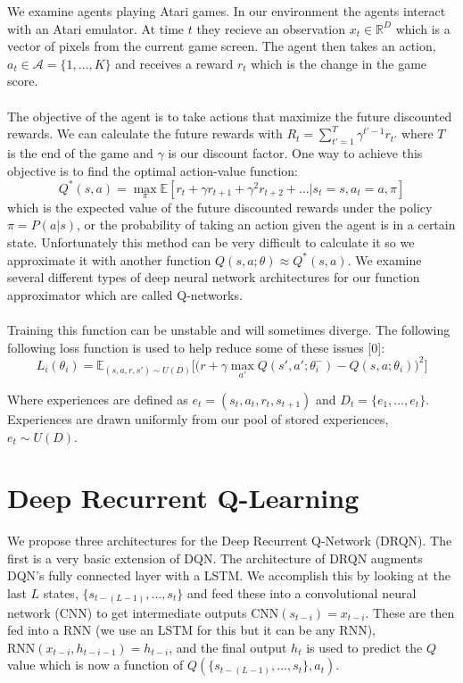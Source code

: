 \documentclass{article}
\begin{document}
We examine agents playing Atari games. In our environment the agents interact with
an Atari emulator. At time $t$ they recieve an observation $x_t \in \mathbb{R}^D$
which is a vector of pixels from the current game screen. The agent then takes an
action, $a_t \in \mathcal{A} = \{1, \dots, K\}$ and receives a reward $r_t$ which
is the change in the game score. \\
\\
The objective of the agent is to take actions that maximize the future discounted
rewards. We can calculate the future rewards with $R_t = \sum_{t' = 1}^T \gamma^{t'-1}r_{t'}$
where $T$ is the end of the game and $\gamma$ is our discount factor. One way
to achieve this objective is to find the optimal action-value function:
$$Q^*(s,a) = \max_{\pi}\mathbb{E}[r_t + \gamma r_{t+1} + \gamma^2 r_{t+2} + \dots
|s_t = s, a_t = a, \pi]$$
which is the expected value of the future discounted rewards under the policy
$\pi = P(a|s)$, or the probability of taking an action given the agent is in a
certain state. Unfortunately this method can be very difficult to calculate it
so we approximate it with another function $Q(s,a;\theta) \approx Q^*(s,a)$. We
examine several different types of deep neural network architectures for our
function approximator which are called Q-networks. \\
\\
Training this function can be unstable and will sometimes diverge. The following
following loss function is used to help reduce some of these issues [0]:
\begin{equation}
    L_i(\theta_i) = \mathbb{E}_{(s,a,r,s') \sim U(D)}\Big[\Big(
    r + \gamma \max_{a'}Q(s',a';\theta_i^-) - Q(s,a;\theta_i)\Big)^2\Big]
\end{equation}

Where experiences are defined as $e_t = (s_t, a_t, r_t, s_{t+1})$ and
$D_t = \{e_1, \dots, e_t\}$. Experiences are drawn uniformly from our pool of
stored experiences, $e_t \sim U(D)$.

\section{Deep Recurrent Q-Learning}
We propose three architectures for the Deep Recurrent Q-Network (DRQN). The first
is a very basic extension of DQN. The architecture of DRQN augments DQN's fully
connected layer with a LSTM. We accomplish this by looking at the last $L$ states,
$\{s_{t-(L-1)}, \dots, s_{t}\}$ and feed these into a convolutional neural network
(CNN) to get intermediate outputs $\text{CNN}(s_{t-i}) = x_{t-i}$. These are then
fed into a RNN (we use an LSTM for this but it can be any RNN),
$\text{RNN}(x_{t-i}, h_{t-i-1}) = h_{t-i}$, and the final output $h_t$ is used to
predict the $Q$ value which is now a function of $Q(\{s_{t-(L-1)}, \dots, s_t\}, a_t)$.
\end{document}

